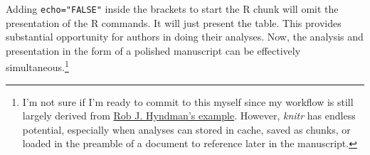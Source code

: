 \documentclass[11pt,]{article}
\begin{document}
Adding \texttt{echo="FALSE"} inside the brackets to start the R chunk
will omit the presentation of the R commands. It will just present the
table. This provides substantial opportunity for authors in doing their
analyses. Now, the analysis and presentation in the form of a polished
manuscript can be effectively simultaneous.\footnote{I'm not sure if I'm
  ready to commit to this myself since my workflow is still largely
  derived from
  \href{http://robjhyndman.com/hyndsight/workflow-in-r/}{Rob J.
  Hyndman's example}. However, \emph{knitr} has endless potential,
  especially when analyses can stored in cache, saved as chunks, or
  loaded in the preamble of a document to reference later in the
  manuscript.}

\newpage
\singlespacing 

\end{document}
